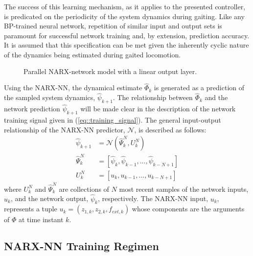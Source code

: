 The success of this learning mechanism, as it applies to the presented controller, is predicated on the periodicity of the 
system dynamics during gaiting. Like any BP-trained neural network, repetition of similar input and output sets is paramount for successful 
network training and, by extension, prediction accuracy. It is assumed that this specification can be met given the 
inherently cyclic nature of the dynamics being estimated during gaited locomotion. 
	\begin{figure}[t!]
		\centering
		\caption{Parallel NARX-network model with a linear output layer.}
		\label{fig::narx_net}
		\vspace{-10mm}
	\end{figure}
Using the NARX-NN, the dynamical estimate $\hat{\Phi}_{k}$ is generated as a prediction of the sampled system 
dynamics, $\hat{\psi}_{k+1}$. The relationship between $\hat{\Phi}_{k}$ and the network prediction $\hat{\psi}_{k+1}$ 
will be made clear in the description of the network training signal given in (\ref{eq::training_signal}). 
The general input-output relationship of the NARX-NN predictor, $\mathscr{N}$, is described as follows:
	\begin{equation}
		\begin{split}
		\hat{\psi}_{k+1}&= \mathscr{N}(\hat{\Psi}_{k}^{N},{U}_{k}^{N}) \\
		\hat{\Psi}_{k}^{N}	&= [\hat{\psi}_{k},\hat{\psi}_{k-1},...,\hat{\psi}_{k-N+1}]  \\
		{U}_{k}^{N}		&= [u_{k}   ,u_{k-1}   ,...,u_{k-N+1}   ]
		\end{split}
		\label{eq::narx_model}
	\end{equation}
where ${U}_{k}^{N}$  and $\hat{\Psi}_{k}^{N}$ are collections of $N$ most recent samples of the network inputs, $u_{k}$, and 
the network output, $\hat{\psi}_{k}$, respectively. The NARX-NN input, $u_{k}$, represents a tuple $u_{k} = (z_{1,k}, z_{2,k}, f_{ext,k})$ whose 
components are the arguments of $\Phi$ at time instant $k$. 



\subsection{NARX-NN Training Regimen}
	


